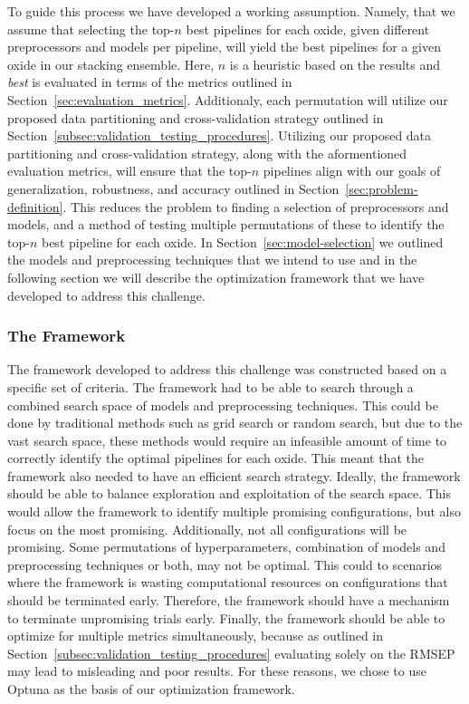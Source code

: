 To guide this process we have developed a working assumption.
Namely, that we assume that selecting the top-$n$ best pipelines for each oxide, given different preprocessors and models per pipeline, will yield the best pipelines for a given oxide in our stacking ensemble.
Here, $n$ is a heuristic based on the results and \textit{best} is evaluated in terms of the metrics outlined in Section~\ref{sec:evaluation_metrics}.
Additionaly, each permutation will utilize our proposed data partitioning and cross-validation strategy outlined in Section~\ref{subsec:validation_testing_procedures}.
Utilizing our proposed data partitioning and cross-validation strategy, along with the aformentioned evaluation metrics, will ensure that the top-$n$ pipelines align with our goals of generalization, robustness, and accuracy outlined in Section~\ref{sec:problem-definition}.
This reduces the problem to finding a selection of preprocessors and models, and a method of testing multiple permutations of these to identify the top-$n$ best pipeline for each oxide.
In Section~\ref{sec:model-selection} we outlined the models and preprocessing techniques that we intend to use and in the following section we will describe the optimization framework that we have developed to address this challenge.

\subsubsection{The Framework}
The framework developed to address this challenge was constructed based on a specific set of criteria.
The framework had to be able to search through a combined search space of models and preprocessing techniques.
This could be done by traditional methods such as grid search or random search, but due to the vast search space, these methods would require an infeasible amount of time to correctly identify the optimal pipelines for each oxide.
This meant that the framework also needed to have an efficient search strategy.
Ideally, the framework should be able to balance exploration and exploitation of the search space.
This would allow the framework to identify multiple promising configurations, but also focus on the most promising.
Additionally, not all configurations will be promising. 
Some permutations of hyperparameters, combination of models and preprocessing techniques or both, may not be optimal.
This could to scenarios where the framework is wasting computational resources on configurations that should be terminated early.
Therefore, the framework should have a mechanism to terminate unpromising trials early.
Finally, the framework should be able to optimize for multiple metrics simultaneously, because as outlined in Section~\ref{subsec:validation_testing_procedures} evaluating solely on the RMSEP may lead to misleading and poor results.
For these reasons, we chose to use Optuna as the basis of our optimization framework.

